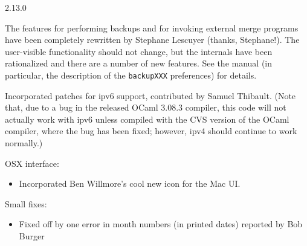 \begin{changesfromversion}{2.13.0}
\item The features for performing backups and for invoking external merge
programs have been completely rewritten by Stephane Lescuyer (thanks,
Stephane!).  The user-visible functionality should not change, but the
internals have been rationalized and there are a number of new features.
See the manual (in particular, the description of the \verb|backupXXX|
preferences) for details.
\item Incorporated patches for ipv6 support, contributed by Samuel Thibault.
(Note that, due to a bug in the released OCaml 3.08.3 compiler, this code
will not actually work with ipv6 unless compiled with the CVS version of the
OCaml compiler, where the bug has been fixed; however, ipv4 should continue
to work normally.)
\item OSX interface:
\begin{itemize}
\item Incorporated Ben Willmore's cool new icon for the Mac UI.
\end{itemize}
\item Small fixes:
\begin{itemize}
\item Fixed off by one error in month numbers (in printed dates) reported
  by Bob Burger
\end{itemize}
\end{changesfromversion}

